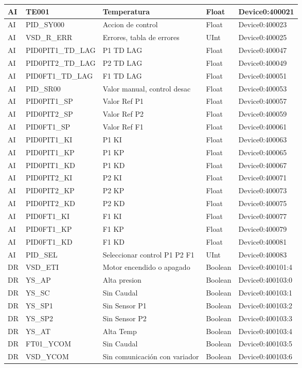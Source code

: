\begin{longtable}{|p{1.2cm} |p{4cm} |p{4cm} |p{1.5cm} |p{3.2cm} |}
	AI & TE001 & Temperatura & Float & Device0:400021 \\ \hline
	AI & PID\_SY000 & Accion de control & Float & Device0:400023 \\ \hline
	AI & VSD\_R\_ERR & Errores, tabla de errores & UInt & Device0:400025 \\ \hline
	AI & PID0PIT1\_TD\_LAG & P1 TD LAG & Float & Device0:400047 \\ \hline
	AI & PID0PIT2\_TD\_LAG & P2 TD LAG & Float & Device0:400049 \\ \hline
	AI & PID0FT1\_TD\_LAG & F1 TD LAG & Float & Device0:400051 \\ \hline
	AI & PID\_SR00 & Valor manual, control desac & Float & Device0:400053 \\ \hline
	AI & PID0PIT1\_SP & Valor Ref P1 & Float & Device0:400057 \\ \hline
	AI & PID0PIT2\_SP & Valor Ref P2 & Float & Device0:400059 \\ \hline
	AI & PID0FT1\_SP & Valor Ref F1 & Float & Device0:400061 \\ \hline
	AI & PID0PIT1\_KI & P1 KI & Float & Device0:400063 \\ \hline
	AI & PID0PIT1\_KP & P1 KP & Float & Device0:400065 \\ \hline
	AI & PID0PIT1\_KD & P1 KD & Float & Device0:400067 \\ \hline
	AI & PID0PIT2\_KI & P2 KI & Float & Device0:400071 \\ \hline
	AI & PID0PIT2\_KP & P2 KP & Float & Device0:400073 \\ \hline
	AI & PID0PIT2\_KD & P2 KD & Float & Device0:400075 \\ \hline
	AI & PID0FT1\_KI & F1 KI & Float & Device0:400077 \\ \hline
	AI & PID0FT1\_KP & F1 KP & Float & Device0:400079 \\ \hline
	AI & PID0FT1\_KD & F1 KD & Float & Device0:400081 \\ \hline
	AI & PID\_SEL & Seleccionar control P1 P2 F1 & UInt & Device0:400083 \\ \hline
	DR & VSD\_ETI & Motor encendido o apagado & Boolean & Device0:400101:4 \\ \hline
	DR & YS\_AP & Alta presion & Boolean & Device0:400103:0 \\ \hline
	DR & YS\_SC & Sin Caudal & Boolean & Device0:400103:1 \\ \hline
	DR & YS\_SP1 & Sin Sensor P1 & Boolean & Device0:400103:2 \\ \hline
	DR & YS\_SP2 & Sin Sensor P2 & Boolean & Device0:400103:3 \\ \hline
	DR & YS\_AT & Alta Temp & Boolean & Device0:400103:4 \\ \hline
	DR & FT01\_YCOM & Sin Caudal & Boolean & Device0:400103:5 \\ \hline
	DR & VSD\_YCOM & Sin comunicación con variador & Boolean & Device0:400103:6 \\ \hline
	
	
\end{longtable}

